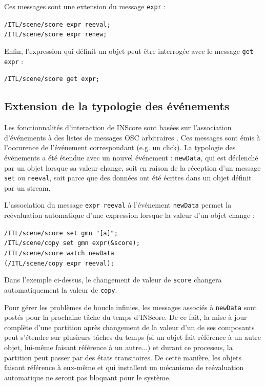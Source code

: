 \documentclass{article}
\newcommand{\OSC}[1]{\texttt{#1}}
\newcommand{\sample}	[1]			{\vspace{-0.2em}\begin{center}\colorbox{mygrey}{\begin{minipage}[t]{0.97\columnwidth} {\small \texttt{#1}}\end{minipage}}\end{center}}
\begin{document}
Ces messages sont une extension du message \OSC{expr} :
\sample{/ITL/scene/score expr reeval; \\
/ITL/scene/score expr renew;
}

Enfin, l'expression qui définit un objet peut être interrogée avec le message \OSC{get expr} :
\sample{/ITL/scene/score get expr;}

\subsection{Extension de la typologie des événements}
\label{exprEvents}

Les fonctionnalités d'interaction de INScore sont basées sur l'association d'événements à des listes de messages OSC arbitraires \cite{Fober:13b}. Ces messages sont émis à l'occurence de l'événement correspondant (e.g. un click).
La typologie des événements a été étendue avec un nouvel événement : \OSC{newData}, qui est déclenché par un objet lorsque sa valeur change, soit en raison de la réception d'un message \OSC{set} ou \OSC{reeval}, soit parce que des données ont été écrites dans un objet définit par un stream.

L'association du message \OSC{expr reeval} à l'événement \OSC{newData} permet la reévaluation automatique d'une expression lorsque la valeur d'un objet change :
\sample{/ITL/scene/score set gmn "[a]";\\
/ITL/scene/copy set gmn expr(\&score);\\
/ITL/scene/score watch newData\\   
\hspace*{8mm}(/ITL/scene/copy expr reeval);
}

Dans l'exemple ci-dessus, le changement de valeur de \OSC{score} changera automatiquement la valeur de \OSC{copy}.

Pour gérer les problèmes de boucle infinies, les messages associés à \OSC{newData} sont postés pour la prochaine tâche du temps d'INScore. De ce fait, la mise à jour complète d'une partition après changement de la valeur d'un de ses composants peut s'étendre sur plusieurs tâches du temps (si un objet fait référence à un autre objet, lui-même faisant référence à un autre...) et durant ce processus, la partition peut passer par des états transitoires. De cette manière, les objets faisant référence à eux-même et qui installent un mécanisme de reévaluation automatique ne seront pas bloquant pour le système.
\end{document}
